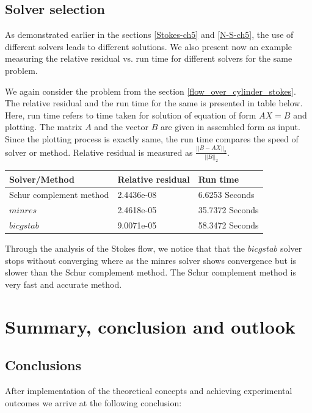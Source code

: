 \documentclass[a4paper,openany]{book}
\begin{document}
\section{Solver selection}

As demonstrated earlier in the sections \ref{Stokes-ch5} and \ref{N-S-ch5}, the use of different solvers leads to different solutions. We also present now an example measuring the relative residual vs. run time for different solvers for the same problem.

We again consider the problem from the section \ref{flow_over_cylinder_stokes}. The relative residual and the run time for the same is presented in table below.
Here, run time refers to time taken for solution of equation of form $AX = B$ and plotting.  The matrix $A$ and the vector $B$ are given in assembled form as input. Since the plotting process is exactly same, the run time compares the speed of solver or method. Relative residual is measured as $\frac{||B-AX||_2}{||B||_2}$.

\begin{longtable}{| p{} | p{} | p{} |}
\hline
\textbf{Solver/Method} & \textbf{Relative residual} & \textbf{Run time}\\
\hline
Schur complement method & 2.4436e-08 & 6.6253 Seconds\\
\hline
$minres$ & 2.4618e-05 & 35.7372 Seconds\\
\hline
$bicgstab$ & 9.0071e-05 & 58.3472 Seconds\\
\hline
\end{longtable}

Through the analysis of the Stokes flow, we notice that that the $bicgstab$ solver stops without converging where as the minres solver shows convergence but is slower than the Schur complement method. The Schur complement method is very fast and accurate method.

\chapter{Summary, conclusion and outlook}

\section{Conclusions}

After implementation of the theoretical concepts and achieving experimental outcomes we arrive at the following conclusion: \\
\end{document}
